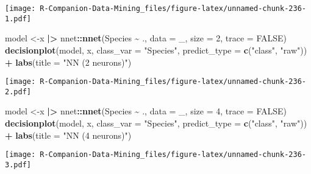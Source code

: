 \documentclass[
  notitlepage]{book}
\newenvironment{Shaded}{\begin{snugshade}}{\end{snugshade}}
\newcommand{\DataTypeTok}[1]{\textcolor[rgb]{0.13,0.29,0.53}{#1}}
\newcommand{\DecValTok}[1]{\textcolor[rgb]{0.00,0.00,0.81}{#1}}
\newcommand{\ErrorTok}[1]{\textcolor[rgb]{0.64,0.00,0.00}{\textbf{#1}}}
\newcommand{\KeywordTok}[1]{\textcolor[rgb]{0.13,0.29,0.53}{\textbf{#1}}}
\newcommand{\NormalTok}[1]{#1}
\newcommand{\OperatorTok}[1]{\textcolor[rgb]{0.81,0.36,0.00}{\textbf{#1}}}
\newcommand{\OtherTok}[1]{\textcolor[rgb]{0.56,0.35,0.01}{#1}}
\newcommand{\StringTok}[1]{\textcolor[rgb]{0.31,0.60,0.02}{#1}}
\begin{document}
\texttt{[image: R-Companion-Data-Mining\_files/figure-latex/unnamed-chunk-236-1.pdf]}

\begin{Shaded}
\begin{Highlighting}[]
\NormalTok{model \textless{}{-}x }\OperatorTok{|}\ErrorTok{\textgreater{}}\StringTok{ }\NormalTok{nnet}\OperatorTok{::}\KeywordTok{nnet}\NormalTok{(Species }\OperatorTok{\textasciitilde{}}\StringTok{ }\NormalTok{., }\DataTypeTok{data =}\NormalTok{ \_, }
                        \DataTypeTok{size =} \DecValTok{2}\NormalTok{, }\DataTypeTok{trace =} \OtherTok{FALSE}\NormalTok{)}
\KeywordTok{decisionplot}\NormalTok{(model, x, }\DataTypeTok{class\_var  =} \StringTok{"Species"}\NormalTok{, }
             \DataTypeTok{predict\_type =} \KeywordTok{c}\NormalTok{(}\StringTok{"class"}\NormalTok{, }\StringTok{"raw"}\NormalTok{)) }\OperatorTok{+}\StringTok{ }
\StringTok{  }\KeywordTok{labs}\NormalTok{(}\DataTypeTok{title =} \StringTok{"NN (2 neurons)"}\NormalTok{)}
\end{Highlighting}
\end{Shaded}

\texttt{[image: R-Companion-Data-Mining\_files/figure-latex/unnamed-chunk-236-2.pdf]}

\begin{Shaded}
\begin{Highlighting}[]
\NormalTok{model \textless{}{-}x }\OperatorTok{|}\ErrorTok{\textgreater{}}\StringTok{ }\NormalTok{nnet}\OperatorTok{::}\KeywordTok{nnet}\NormalTok{(Species }\OperatorTok{\textasciitilde{}}\StringTok{ }\NormalTok{., }\DataTypeTok{data =}\NormalTok{ \_, }
                        \DataTypeTok{size =} \DecValTok{4}\NormalTok{, }\DataTypeTok{trace =} \OtherTok{FALSE}\NormalTok{)}
\KeywordTok{decisionplot}\NormalTok{(model, x, }\DataTypeTok{class\_var  =} \StringTok{"Species"}\NormalTok{, }
             \DataTypeTok{predict\_type =} \KeywordTok{c}\NormalTok{(}\StringTok{"class"}\NormalTok{, }\StringTok{"raw"}\NormalTok{)) }\OperatorTok{+}\StringTok{ }
\StringTok{  }\KeywordTok{labs}\NormalTok{(}\DataTypeTok{title =} \StringTok{"NN (4 neurons)"}\NormalTok{)}
\end{Highlighting}
\end{Shaded}

\texttt{[image: R-Companion-Data-Mining\_files/figure-latex/unnamed-chunk-236-3.pdf]}
\end{document}
